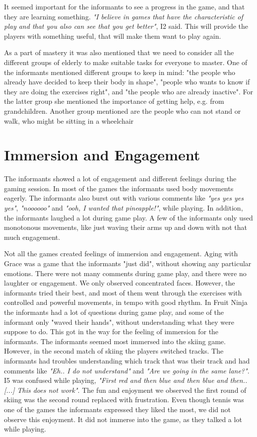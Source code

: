 It seemed important for the informants to see a progress in the game, and that they are learning something. \emph{"I believe in games that have the characteristic of play and that you also can see that you get better"}, I2 said. This will provide the players with something useful, that will make them want to play again.

As a part of mastery it was also mentioned that we need to consider all the different groups of elderly to make suitable tasks for everyone to master. One of the informants mentioned different groups to keep in mind: "the people who already have decided to keep their body in shape", "people who wants to know if they are doing the exercises right", and "the people who are already inactive". For the latter group she mentioned the importance of getting help, e.g. from grandchildren.  Another group mentioned are the people who can not stand or walk, who might be sitting in a wheelchair

\section{Immersion and Engagement}
The informants showed a lot of engagement and different feelings during the gaming session. In most of the games the informants used body movements eagerly. The informants also burst out with various comments like \emph{"yes yes yes yes"}, \emph{"noooooo"} and \emph{"ooh, I wanted that pineapple!"}, while playing. In addition, the informants laughed a lot during game play. A few of the informants only used monotonous movements, like just waving their arms up and down with not that much engagement.  

Not all the games created feelings of immersion and engagement. Aging with Grace was a game that the informants "just did", without showing any particular emotions. There were not many comments during game play, and there were no laughter or engagement. We only observed concentrated faces. However, the informants tried their best, and most of them went through the exercises with controlled and powerful movements, in tempo with good rhythm. In Fruit Ninja the informants had a lot of questions during game play, and some of the informant only "waved their hands", without understanding what they were suppose to do. This got in the way for the feeling of immersion for the informants. The informants seemed most immersed into the skiing game. However, in the second match of skiing the players switched tracks. The informants had troubles understanding which track that was their track and had comments like \emph{"Eh.. I do not understand"} and \emph{"Are we going in the same lane?"}. I5 was confused while playing, \emph{"First red and then blue and then blue and then.. [...] This does not work"}. The fun and enjoyment we observed the first round of skiing was the second round replaced with frustration. Even though tennis was one of the games the informants expressed they liked the most, we did not observe this enjoyment. It did not immerse into the game, as they talked a lot while playing. 

